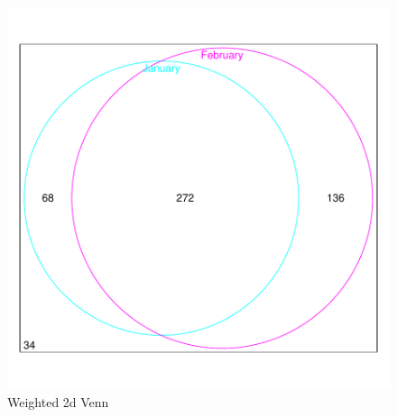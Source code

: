 \documentclass[a4paper]{article}
\begin{document}
\begin{figure}[H]
  \begin{center}
\includegraphics{Vennfig-pv2b2}
\caption{Weighted 2d Venn}
\label{fig:pv2b2}
\end{center}\end{figure}
\end{document}
